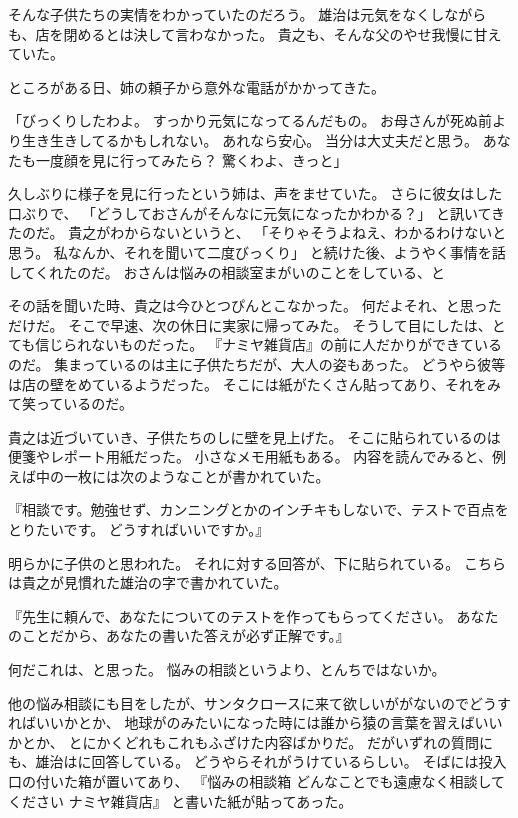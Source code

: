 \documentclass[chapter3.tex]{subfiles}
\begin{document}
\begin{CJK}{UTF8}{ipxm}
    そんな子供たちの実情をわかっていたのだろう。
    雄治は元気をなくしながらも、店を閉めるとは決して言わなかった。
    貴之も、そんな父のやせ我慢に甘えていた。

    ところがある日、姉の頼子から意外な電話がかかってきた。

    「びっくりしたわよ。
    すっかり元気になってるんだもの。
    お母さんが死ぬ前より生き生きしてるかもしれない。
    あれなら安心。
    当分は大丈夫だと思う。
    あなたも一度顔を見に行ってみたら？
    驚くわよ、きっと」

    久しぶりに様子を見に行ったという姉は、声をませていた。
    さらに彼女はした口ぶりで、
    「どうしておさんがそんなに元気になったかわかる？」
    と訊いてきたのだ。
    貴之がわからないというと、
    「そりゃそうよねえ、わかるわけないと思う。
    私なんか、それを聞いて二度びっくり」
    と続けた後、ようやく事情を話してくれたのだ。
    おさんは悩みの相談室まがいのことをしている、と

    その話を聞いた時、貴之は今ひとつぴんとこなかった。
    何だよそれ、と思っただけだ。
    そこで早速、次の休日に実家に帰ってみた。
    そうして目にしたは、とても信じられないものだった。
    『ナミヤ雑貨店』の前に人だかりができているのだ。
    集まっているのは主に子供たちだが、大人の姿もあった。
    どうやら彼等は店の壁をめているようだった。
    そこには紙がたくさん貼ってあり、それをみて笑っているのだ。

    貴之は近づいていき、子供たちのしに壁を見上げた。
    そこに貼られているのは便箋やレポート用紙だった。
    小さなメモ用紙もある。
    内容を読んでみると、例えば中の一枚には次のようなことが書かれていた。

    『相談です。勉強せず、カンニングとかのインチキもしないで、テストで百点をとりたいです。
    どうすればいいですか。』

    明らかに子供のと思われた。
    それに対する回答が、下に貼られている。
    こちらは貴之が見慣れた雄治の字で書かれていた。

    『先生に頼んで、あなたについてのテストを作ってもらってください。
    あなたのことだから、あなたの書いた答えが必ず正解です。』

    何だこれは、と思った。
    悩みの相談というより、とんちではないか。

    他の悩み相談にも目をしたが、サンタクロースに来て欲しいががないのでどうすればいいかとか、
    地球がのみたいになった時には誰から猿の言葉を習えばいいかとか、
    とにかくどれもこれもふざけた内容ばかりだ。
    だがいずれの質問にも、雄治はに回答している。
    どうやらそれがうけているらしい。
    そばには投入口の付いた箱が置いてあり、
    『悩みの相談箱 \;
    どんなことでも遠慮なく相談してください \;
    ナミヤ雑貨店』
    と書いた紙が貼ってあった。


\end{CJK}
\end{document}
